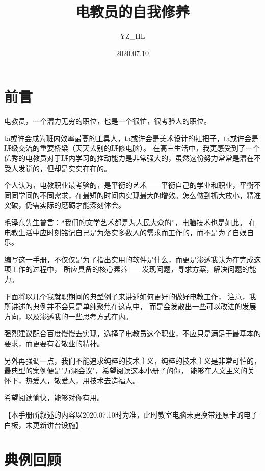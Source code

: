 \documentclass{article}
\begin{document}
\title{电教员的自我修养}
\author{YZ\_HL}
\date{2020.07.10}
\maketitle
\thispagestyle{empty}
\newpage

\tableofcontents
\thispagestyle{empty}
\newpage

\setcounter{page}{1}

\section{前言}
电教员，一个潜力无穷的职位，也是一个很忙，很考验人的职位。

ta或许会成为班内效率最高的工具人，ta或许会是美术设计的扛把子，ta或许会是班级交流的重要桥梁（天天去别的班修电脑）。
在高三生活中，我更感受到了一个优秀的电教员对于班内学习的推动能力是非常强大的，虽然这份努力常常是潜在不受人发觉的，但却是实实在在的。

个人认为，电教职业最考验的，是平衡的艺术——平衡自己的学业和职业，平衡不同同学间的不同需求，在最短的时间内实现最大的增效。怎么做到抓大放小，精准突破，仍需实际的磨砺才能深刻体会。

毛泽东先生曾言：“我们的文学艺术都是为人民大众的”，电脑技术也是如此。
在电教生活中应时刻铭记自己是为落实多数人的需求而工作的，而不是为了自娱自乐。

编写这一手册，不仅仅是为了指出实用的软件是什么，而更是渗透我认为在完成这项工作的过程中，
所应具备的核心素养——发现问题，寻求方案，解决问题的能力。

下面将以几个我就职期间的典型例子来讲述如何更好的做好电教工作，
注意，我所讲述的典例并不会只是单纯聚焦在这点中，
而是会发散出一些可以改进的发展方向，以及渗透我的一些思考方式在内。

强烈建议配合百度慢慢去实现，选择了电教员这个职业，不应只是满足于最基本的要求，而更要有着敬业的精神。

另外再强调一点，我们不能追求纯粹的技术主义，纯粹的技术主义是非常可怕的，最典型的案例便是"万湖会议"，希望阅读这本小册子的你，
能够在人文主义的关怀下，热爱人，敬爱人，用技术去造福人。

希望阅读愉快，能够对你有用。

【本手册所叙述的内容以2020.07.10时为准，此时教室电脑未更换带还原卡的电子白板，未更新讲台设施】
\newpage

\section{典例回顾}
\end{document}
